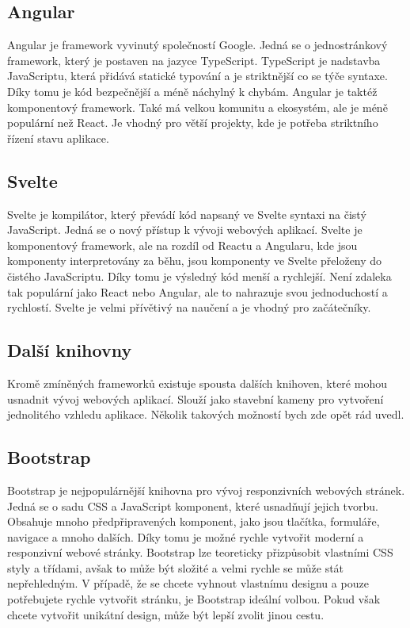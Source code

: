 \subsection*{Angular}
\label{subsec:angular}

Angular je framework vyvinutý společností Google. Jedná se o jednostránkový framework, který je postaven na jazyce TypeScript. TypeScript je nadstavba JavaScriptu, která přidává statické typování a je striktnější co se týče syntaxe. Díky tomu je kód bezpečnější a méně náchylný k chybám. Angular je taktéž komponentový framework. Také má velkou komunitu a ekosystém, ale je méně populární než React. Je vhodný pro větší projekty, kde je potřeba striktního řízení stavu aplikace.

\subsection*{Svelte}
\label{subsec:svelte}

Svelte je kompilátor, který převádí kód napsaný ve Svelte syntaxi na čistý JavaScript. Jedná se o nový přístup k vývoji webových aplikací. Svelte je komponentový framework, ale na rozdíl od Reactu a Angularu, kde jsou komponenty interpretovány za běhu, jsou komponenty ve Svelte přeloženy do čistého JavaScriptu. Díky tomu je výsledný kód menší a rychlejší. Není zdaleka tak populární jako React nebo Angular, ale to nahrazuje svou jednoduchostí a rychlostí. Svelte je velmi přívětivý na naučení a je vhodný pro začátečníky.

\subsection{Další knihovny}
\label{sec:other-libraries}

Kromě zmíněných frameworků existuje spousta dalších knihoven, které mohou usnadnit vývoj webových aplikací. Slouží jako stavební kameny pro vytvoření jednolitého vzhledu aplikace. Několik takových možností bych zde opět rád uvedl.

\subsection*{Bootstrap}
\label{subsec:bootstrap}

Bootstrap je nejpopulárnější knihovna pro vývoj responzivních webových stránek. Jedná se o sadu CSS a JavaScript komponent, které usnadňují jejich tvorbu. Obsahuje mnoho předpřipravených komponent, jako jsou tlačítka, formuláře, navigace a mnoho dalších. Díky tomu je možné rychle vytvořit moderní a responzivní webové stránky. Bootstrap lze teoreticky přizpůsobit vlastními CSS styly a třídami, avšak to může být složité a velmi rychle se může stát nepřehledným. V případě, že se chcete vyhnout vlastnímu designu a pouze potřebujete rychle vytvořit stránku, je Bootstrap ideální volbou. Pokud však chcete vytvořit unikátní design, může být lepší zvolit jinou cestu.

